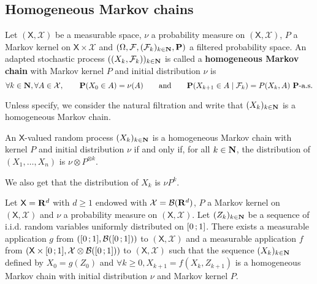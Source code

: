 \subsection{Homogeneous Markov chains}

	\begin{defn}
		Let $(\mathsf{X},\mathcal{X})$ be a measurable space, $\nu$ a probability measure on $(\mathsf{X},\mathcal{X})$, $P$ a Markov kernel on $\mathsf{X} \times \mathcal{X}$ and $(\Omega,\mathcal{F},(\mathcal{F}_k)_{k \in \mathbf{N}},\mathbf{P})$ a filtered probability space.
		An adapted stochastic process $((X_k, \mathcal{F}_k))_{k \in \mathbf{N}}$ is called a \textbf{homogeneous Markov chain} with Markov kernel $P$ and initial distribution $\nu$ is
		$$\forall k \in \N, \forall A \in \mathcal{X},\qquad \proba(X_0 \in A) = \nu(A) \qquad \text{and} \qquad \proba(X_{k + 1} \in A \mid \mathcal{F}_k) = P(X_k,A)\ \proba\text{-a.s.}$$ 
	\end{defn}
	
	\begin{note}
		Unless specify, we consider the natural filtration and write that $(X_k)_{k \in \mathbf{N}}$ is a homogeneous Markov chain.
	\end{note}
	
	\begin{pop}
		An $\mathsf{X}$-valued random process $(X_k)_{k \in \mathbf{N}}$ is a homogeneous Markov chain with kernel $P$ and initial distribution $\nu$ if and only if, for all $k \in \mathbf{N}$, the distribution of $(X_1,\ldots,X_n)$ is $\nu \otimes P^{\otimes k}$.
	\end{pop}
	
	We also get that the distribution of $X_k$ is $\nu P^k$.

	\begin{thm}
		Let $\mathsf{X} = \mathbf{R}^d$ with $d \geq 1$ endowed with $\mathcal{X} = \mathcal{B}(\mathbf{R}^d)$, $P$ a Markov kernel on $(\mathsf{X},\mathcal{X})$ and $\nu$ a probability measure on $(\mathsf{X},\mathcal{X})$.
		Let $(Z_k)_{k \in \mathbf{N}}$ be a sequence of i.i.d. random variables uniformly distributed on $\mathopen{[}0\mathclose{}\mathpunct{};1\mathclose{]}$.
		There exists a measurable application $g$ from $(\mathopen{[}0\mathclose{}\mathpunct{};1\mathclose{]}, \mathcal{B}(\mathopen{[}0\mathclose{}\mathpunct{};1\mathclose{]}))$ to $(\mathsf{X},\mathcal{X})$ and a measurable application $f$ from $(\mathsf{X} \times \mathopen{[}0\mathclose{}\mathpunct{};1\mathclose{]}, \mathcal{X} \otimes \mathcal{B}(\mathopen{[}0\mathclose{}\mathpunct{};1\mathclose{]}))$ to $(\mathsf{X},\mathcal{X})$ such that the sequence $(X_k)_{k \in \mathbf{N}}$ defined by $X_0 = g(Z_0)$ and $\forall k \geq 0, X_{k + 1} = f(X_k, Z_{k + 1})$ is a homogeneous Markov chain with initial distribution $\nu$ and Markov kernel $P$.
	\end{thm}

